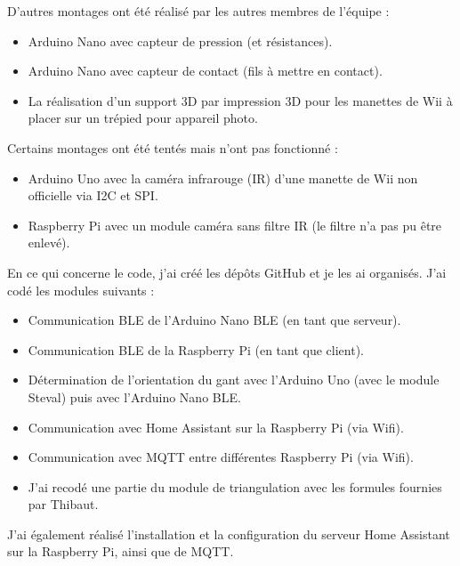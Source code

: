 \documentclass{article}
\begin{document}
            D'autres montages ont été réalisé par les autres membres de l'équipe :
            \begin{itemize}
                \item Arduino Nano avec capteur de pression (et résistances).
                \item Arduino Nano avec capteur de contact (fils à mettre en contact).
                \item La réalisation d'un support 3D par impression 3D pour les manettes de Wii à placer sur un trépied pour appareil photo.
            \end{itemize}

            Certains montages ont été tentés mais n'ont pas fonctionné :
            \begin{itemize}
                \item Arduino Uno avec la caméra infrarouge (IR) d'une manette de Wii non officielle via I2C et SPI.
                \item Raspberry Pi avec un module caméra sans filtre IR (le filtre n'a pas pu être enlevé).
            \end{itemize}

            En ce qui concerne le code, j'ai créé les dépôts GitHub et je les ai organisés. J'ai codé les modules suivants :
            \begin{itemize}
                \item Communication BLE de l'Arduino Nano BLE (en tant que serveur).
                \item Communication BLE de la Raspberry Pi (en tant que client).
                \item Détermination de l'orientation du gant avec l'Arduino Uno (avec le module Steval) puis avec l'Arduino Nano BLE.
                \item Communication avec Home Assistant sur la Raspberry Pi (via Wifi).
                \item Communication avec MQTT entre différentes Raspberry Pi (via Wifi).
                \item J'ai recodé une partie du module de triangulation avec les formules fournies par Thibaut.
            \end{itemize}

            J'ai également réalisé l'installation et la configuration du serveur Home Assistant sur la Raspberry Pi, ainsi 
            que de MQTT.
\end{document}
